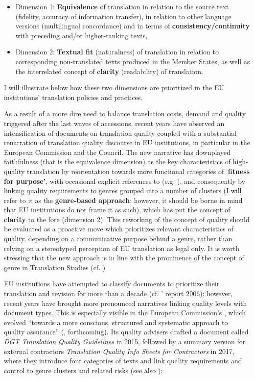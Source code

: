 \documentclass[output=paper]{langsci/langscibook}
\begin{document}
\begin{itemize}
\item 
Dimension 1: \textbf{Equivalence} of translation in relation to the source text (fidelity, accuracy of information transfer), in relation to other language versions (multilingual concordance) and in terms of \textbf{consistency/continuity} with preceding and/or higher-ranking texts,
\item 
Dimension 2: \textbf{Textual fit} (naturalness) of translation in relation to corresponding non-translated texts produced in the Member States, as well as the interrelated concept of \textbf{clarity} (readability) of translation.
\end{itemize}

I will illustrate below how these two dimensions are prioritized in the EU institutions’ translation policies and practices.

As a result of a more dire need to balance translation costs, demand and quality triggered after the last waves of accessions, recent years have observed an intensification of documents on translation quality coupled with a substantial renarration of translation quality discourse in EU institutions, in particular in the European Commission and the Council. The new narrative has downplayed faithfulness (that is the equivalence dimension) as the key characteristics of high-quality translation by reorientation towards more functional categories of ‘\textbf{fitness for purpose’}, with occasional explicit references to \citeauthor{ISO2015} (e.g. \citealt[3]{DGT2015j}), and consequently by linking quality requirements to genres grouped into a number of clusters (I will refer to it as the \textbf{genre-based approach}; however, it should be borne in mind that EU institutions do not frame it as such), which has put the concept of \textbf{clarity} to the fore (dimension 2). This reworking of the concept of quality should be evaluated as a proactive move which prioritizes relevant characteristics of quality, depending on a communicative purpose behind a genre, rather than relying on a stereotyped perception of EU translation as legal only. It is worth stressing that the new approach is in line with the prominence of the concept of genre in Translation Studies (cf. \citealt{Biel2017}) %

EU institutions have attempted to classify documents to prioritize their translation and revision for more than a decade (cf. \citeauthor{EuropeanCourt2006}’ report 2006); however, recent years have brought more pronounced narratives linking quality levels with document types. This is especially visible in the European Commission’s \citeauthor{DGT2015j}, which evolved “towards a more conscious, structured and systematic approach to quality assurance” (\citealt{Strandvik2017}, forthcoming). Its quality advisers drafted a document called \textit{DGT Translation Quality Guidelines} in 2015, followed by a summary version for external contractors \textit{Translation Quality Info Sheets for Contractors} in 2017, where they introduce four categories of texts and link quality requirements and control to genre clusters and related risks (see also \citealt{Strandvik2017forthcoming}):
\end{document}
